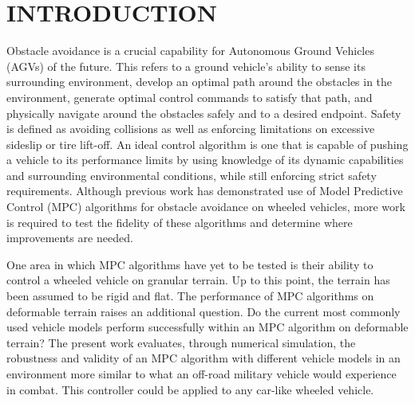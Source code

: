 \documentclass[12pt,onecolumn]{report}
\begin{document}
\begin{singlespace}
\newpage
\begingroup
\renewcommand{\vspace}[2]{}%
\tableofcontents
\endgroup




\newpage
\begingroup
\renewcommand{\vspace}[2]{}%
{}
\listoftables
\endgroup
\newpage
\begingroup
{}
\renewcommand{\vspace}[2]{}%
\listoffigures
\endgroup
\end{singlespace}

\newpage
{}
\setcounter{page}{1}
\chapter{INTRODUCTION}\label{c:introduction}

Obstacle avoidance is a crucial capability for Autonomous Ground Vehicles (AGVs) of the future. This refers to a ground vehicle's ability to sense its surrounding environment, develop an optimal path around the obstacles in the environment, generate optimal control commands to satisfy that path, and physically navigate around the obstacles safely and to a desired endpoint. Safety is defined as avoiding collisions as well as enforcing limitations on excessive sideslip or tire lift-off. An ideal control algorithm is one that is capable of pushing a vehicle to its performance limits by using knowledge of its dynamic capabilities and surrounding environmental conditions, while still enforcing strict safety requirements. Although previous work has demonstrated use of Model Predictive Control (MPC) algorithms for obstacle avoidance on wheeled vehicles, more work is required to test the fidelity of these algorithms and determine where improvements are needed. 

One area in which MPC algorithms have yet to be tested is their ability to control a wheeled vehicle on granular terrain. Up to this point, the terrain has been assumed to be rigid and flat. The performance of MPC algorithms on deformable terrain raises an additional question. Do the current most commonly used vehicle models perform successfully within an MPC algorithm on deformable terrain? The present work evaluates, through numerical simulation, the robustness and validity of an MPC algorithm with different vehicle models in an environment more similar to what an off-road military vehicle would experience in combat. This controller could be applied to any car-like wheeled vehicle.
\end{document}
